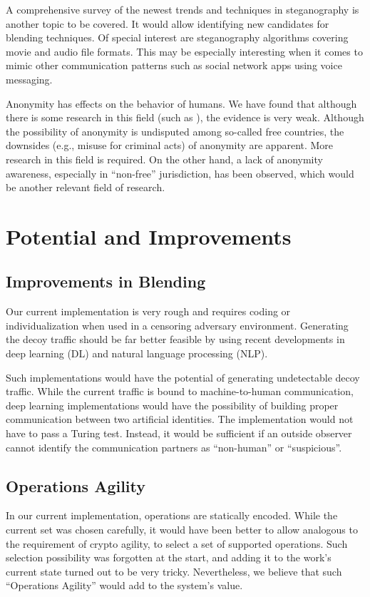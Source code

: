 A comprehensive survey of the newest trends and techniques in steganography is another topic to be covered. It would allow identifying new candidates for blending techniques. Of special interest are steganography algorithms covering movie and audio file formats. This may be especially interesting when it comes to mimic other communication patterns such as social network apps using voice messaging.

Anonymity has effects on the behavior of humans. We have found that although there is some research in this field (such as \cite{postmes2001social}), the evidence is very weak. Although the possibility of anonymity is undisputed among so-called free countries, the downsides (e.g., misuse for criminal acts) of anonymity are apparent. More research in this field is required. On the other hand, a lack of anonymity awareness, especially in ``non-free'' jurisdiction, has been observed, which would be another relevant field of research. 

\chapter{Potential and Improvements}
\section{Improvements in Blending}
Our current implementation is very rough and requires coding or individualization when used in a censoring adversary environment. Generating the decoy traffic should be far better feasible by using recent developments in deep learning (DL) and natural language processing (NLP). 

Such implementations would have the potential of generating undetectable decoy traffic. While the current traffic is bound to machine-to-human communication, deep learning implementations would have the possibility of building proper communication between two artificial identities. The implementation would not have to pass a Turing test. Instead, it would be sufficient if an outside observer cannot identify the communication partners as ``non-human'' or ``suspicious''.

\section{Operations Agility}
In our current implementation, operations are statically encoded. While the current set was chosen carefully, it would have been better to allow analogous to the requirement of crypto agility, to select a set of supported operations. Such selection possibility was forgotten at the start, and adding it to the work's current state turned out to be very tricky. Nevertheless, we believe that such ``Operations Agility'' would add to the system's value.

